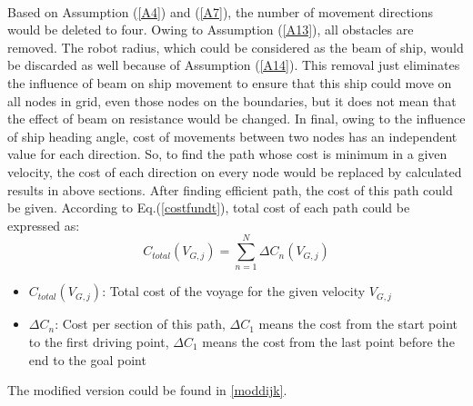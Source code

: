 \\Based on Assumption (\ref{A4}) and (\ref{A7}), the number of movement directions would be deleted to four. Owing to Assumption (\ref{A13}), all obstacles are removed. The robot radius, which could be considered as the beam of ship, would be discarded as well because of Assumption (\ref{A14}). This removal just eliminates the influence of beam on ship movement to ensure that this ship could move on all nodes in grid, even those nodes on the boundaries, but it does not mean that the effect of beam on resistance would be changed. In final, owing to the influence of ship heading angle, cost of movements between two nodes has an independent value for each direction. So, to find the path whose cost is minimum in a given velocity, the cost of each direction on every node would be replaced by calculated results in above sections.  After finding efficient path, the cost of this path could be given. According to Eq.(\ref{costfundt}), total cost of each path could be expressed as:
\begin{equation}
    C_{total}(V_{G,j})=\sum_{n=1}^N \Delta C_{n}(V_{G,j})
\end{equation}
\begin{itemize}
    \item $C_{total}(V_{G,j})$: Total cost of the voyage for the given velocity $V_{G,j}$
    \item $\Delta C_{n}$: Cost per section of this path, $\Delta C_{1}$ means the cost from the start point to the first driving point,  $\Delta C_{1}$ means the cost from the last point before the end to the goal point
\end{itemize}
The modified version could be found in \autoref{moddijk}.
